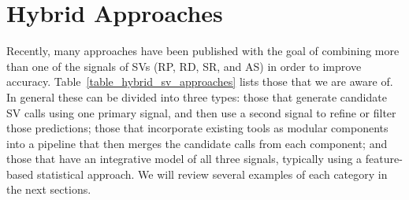 \section{Hybrid Approaches}\label{section_hybrid_approaches}

Recently, many approaches have been published with the goal of combining more than one of the signals of SVs (RP, RD, SR, and AS) in order to improve accuracy. Table~\ref{table_hybrid_sv_approaches} lists those that we are aware of. In general these can be divided into three types: those that generate candidate SV calls using one primary signal, and then use a second signal to refine or filter those predictions; those that incorporate existing tools as modular components into a pipeline that then merges the candidate calls from each component; and those that have an integrative model of all three signals, typically using a feature-based statistical approach. We will review several examples of each category in the next sections.

